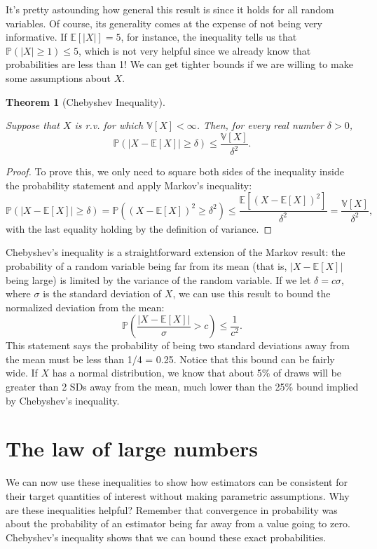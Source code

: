 \documentclass[
  13pt,
  letterpaper,
  DIV=11,
  numbers=noendperiod]{scrreprt}
\newcommand{\E}{\mathbb{E}}
\newcommand{\V}{\mathbb{V}}
\renewcommand{\P}{\mathbb{P}}
\theoremstyle{plain}
\newtheorem{theorem}{Theorem}[chapter]
\theoremstyle{definition}
\theoremstyle{definition}
\theoremstyle{remark}
\begin{document}
It's pretty astounding how general this result is since it holds for all
random variables. Of course, its generality comes at the expense of not
being very informative. If \(\E[|X|] = 5\), for instance, the inequality
tells us that \(\P(|X| \geq 1) \leq 5\), which is not very helpful since
we already know that probabilities are less than 1! We can get tighter
bounds if we are willing to make some assumptions about \(X\).

\begin{theorem}[Chebyshev
Inequality]\protect\hypertarget{thm-chebyshev}{}\label{thm-chebyshev}

Suppose that \(X\) is r.v. for which \(\V[X] < \infty\). Then, for every
real number \(\delta > 0\), \[
\P(|X-\E[X]| \geq \delta) \leq \frac{\V[X]}{\delta^2}.
\]

\end{theorem}

\begin{proof}
To prove this, we only need to square both sides of the inequality
inside the probability statement and apply Markov's inequality: \[
\P\left( |X - \E[X]| \geq \delta \right) = \P((X-\E[X])^2 \geq \delta^2) \leq \frac{\E[(X - \E[X])^2]}{\delta^2} = \frac{\V[X]}{\delta^2},
\] with the last equality holding by the definition of variance.
\end{proof}

Chebyshev's inequality is a straightforward extension of the Markov
result: the probability of a random variable being far from its mean
(that is, \(|X-\E[X]|\) being large) is limited by the variance of the
random variable. If we let \(\delta = c\sigma\), where \(\sigma\) is the
standard deviation of \(X\), we can use this result to bound the
normalized deviation from the mean: \[
\P\left(\frac{|X - \E[X]|}{\sigma} > c \right) \leq \frac{1}{c^2}.
\] This statement says the probability of being two standard deviations
away from the mean must be less than 1/4 = 0.25. Notice that this bound
can be fairly wide. If \(X\) has a normal distribution, we know that
about 5\% of draws will be greater than 2 SDs away from the mean, much
lower than the 25\% bound implied by Chebyshev's inequality.

\section{The law of large numbers}\label{the-law-of-large-numbers}

We can now use these inequalities to show how estimators can be
consistent for their target quantities of interest without making
parametric assumptions. Why are these inequalities helpful? Remember
that convergence in probability was about the probability of an
estimator being far away from a value going to zero. Chebyshev's
inequality shows that we can bound these exact probabilities.
\end{document}
